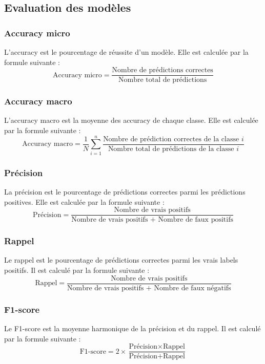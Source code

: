 \subsection{Evaluation des modèles}
\subsubsection{Accuracy micro}
L'accuracy est le pourcentage de réussite d'un modèle. Elle est calculée par la formule suivante :
\begin{equation}
    \text{Accuracy micro} = \frac{\text{Nombre de prédictions correctes}}{\text{Nombre total de prédictions}}
\end{equation}

\subsubsection{Accuracy macro}
L'accuracy macro est la moyenne des accuracy de chaque classe. Elle est calculée par la formule suivante :
\begin{equation}
    \text{Accuracy macro} = \frac{1}{N} \sum_{i=1}^{n} \frac{\text{Nombre de prédiction correctes de la classe } i}{\text{Nombre total de prédictions de la classe } i}{}
\end{equation}

\subsubsection{Précision}
La précision est le pourcentage de prédictions correctes parmi les prédictions positives. Elle est calculée par la formule suivante :
\begin{equation}
    \text{Précision} = \frac{\text{Nombre de vrais positifs}}{\text{Nombre de vrais positifs + Nombre de faux positifs}}
\end{equation}

\subsubsection{Rappel}
Le rappel est le pourcentage de prédictions correctes parmi les vrais labels positifs. Il est calculé par la formule suivante :
\begin{equation}
    \text{Rappel} = \frac{\text{Nombre de vrais positifs}}{\text{Nombre de vrais positifs + Nombre de faux négatifs}} 
\end{equation}

\subsubsection{F1-score}
Le F1-score est la moyenne harmonique de la précision et du rappel. Il est calculé par la formule suivante :
\begin{equation}
    \text{F1-score} = 2 \times \frac{\text{Précision} \times \text{Rappel}}{\text{Précision} + \text{Rappel}}
\end{equation}

